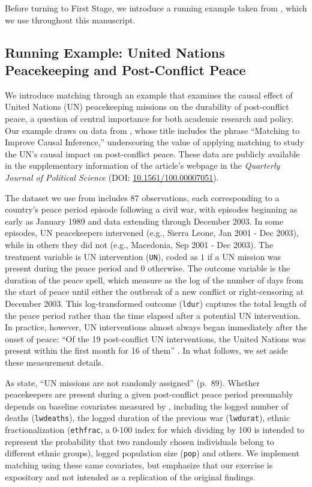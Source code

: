 \documentclass[
  12pt,
  leqno]{article}
\begin{document}
Before turning to First Stage, we introduce a running example taken from
\citet{gilligansergenti2008}, which we use throughout this manuscript.

\subsection{Running Example: United Nations Peacekeeping and
Post-Conflict
Peace}\label{running-example-united-nations-peacekeeping-and-post-conflict-peace}

We introduce matching through an example that examines the causal effect
of United Nations (UN) peacekeeping missions on the durability of
post-conflict peace, a question of central importance for both academic
research and policy. Our example draws on data from
\citet{gilligansergenti2008}, whose title includes the phrase ``Matching
to Improve Causal Inference,'' underscoring the value of applying
matching to study the UN's causal impact on post-conflict peace. These
data are publicly available in the supplementary information of the
article's webpage in the \emph{Quarterly Journal of Political Science}
(DOI:
\href{https://doi.org/10.1561/100.00007051}{10.1561/100.00007051}).

The dataset we use from \citet{gilligansergenti2008} includes 87
observations, each corresponding to a country's peace period episode
following a civil war, with episodes beginning as early as January 1989
and data extending through December 2003. In some episodes, UN
peacekeepers intervened (e.g., Sierra Leone, Jan 2001 - Dec 2003), while
in others they did not (e.g., Macedonia, Sep 2001 - Dec 2003). The
treatment variable is UN intervention (\texttt{UN}), coded as \(1\) if a
UN mission was present during the peace period and \(0\) otherwise. The
outcome variable is the duration of the peace spell, which
\citet{gilligansergenti2008} measure as the log of the number of days
from the start of peace until either the outbreak of a new conflict or
right-censoring at December 2003. This log-transformed outcome
(\texttt{ldur}) captures the total length of the peace period rather
than the time elapsed after a potential UN intervention. In practice,
however, UN interventions almost always began immediately after the
onset of peace: ``Of the 19 post-conflict UN interventions, the United
Nations was present within the first month for 16 of them''
\citep[p.~118]{gilligansergenti2008}. In what follows, we set aside
these measurement details.

As \citet{gilligansergenti2008} state, ``UN missions are not randomly
assigned'' (p.~89). Whether peacekeepers are present during a given
post-conflict peace period presumably depends on baseline covariates
measured by \citet{gilligansergenti2008}, including the logged number of
deaths (\texttt{lwdeaths}), the logged duration of the previous war
(\texttt{lwdurat}), ethnic fractionalization (\texttt{ethfrac}, a 0-100
index for which dividing by 100 is intended to represent the probability
that two randomly chosen individuals belong to different ethnic groups),
logged population size (\texttt{pop}) and others. We implement matching
using these same covariates, but emphasize that our exercise is
expository and not intended as a replication of the original findings.
\end{document}
